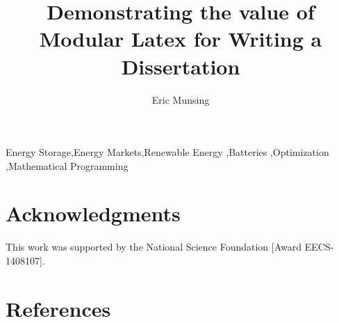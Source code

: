 \documentclass[review]{elsarticle}
\begin{document}
\begin{frontmatter}

\title{Demonstrating the value of Modular Latex for Writing a Dissertation}

\author[ecal]{Eric Munsing}


\address[ecal]{Energy, Controls, and Applications Laboratory, University of California at Berkeley, Berkeley CA, USA}


\begin{abstract}
\lipsum[2]
\end{abstract}

\begin{keyword}
Energy Storage\sep Energy Markets\sep Renewable Energy \sep Batteries \sep Optimization \sep Mathematical Programming
\end{keyword}

\end{frontmatter}

\linenumbers



\section{Acknowledgments}
This work was supported by the National Science Foundation [Award EECS-1408107].

\section*{References}


\end{document}
